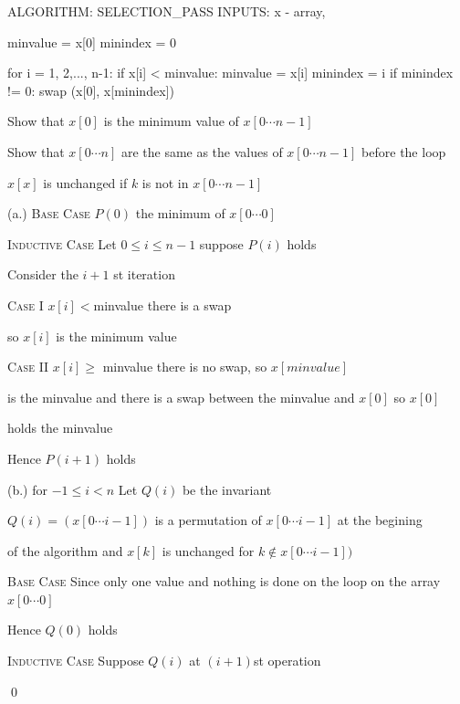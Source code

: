 
\begin{console}
ALGORITHM: SELECTION_PASS
INPUTS: x - array,

minvalue = x[0]
minindex = 0

for i = 1, 2,..., n-1:
    if x[i] < minvalue:
        minvalue = x[i]
        minindex = i
if minindex != 0:
    swap (x[0], x[minindex])
\end{console}

\begin{tightlist}
\item[a.] Show that $x[0]$ is the minimum value of $x[0 \cdots n-1]$
\item[b.] Show that $x[0 \cdots n]$ are the same as the values of $x[0 \cdots n-1]$ before the loop
\item[c.] $x[x]$ is unchanged if $k$ is not in $x[0 \cdots n-1]$
\end{tightlist}

(a.)
\textsc{Base Case} $P(0)$ the minimum of $x[0 \cdots 0]$

\textsc{Inductive Case} Let $0 \leq i \leq n-1$ suppose $P(i)$ holds

Consider the $i+1$ st iteration

\textsc{Case I} $x[i] < $minvalue there is a swap

so $x[i]$ is the minimum value

\textsc{Case II} $x[i] \geq$ minvalue there is no swap, so $x[minvalue]$

is the minvalue and there is a swap between the minvalue and $x[0]$ so $x[0]$

holds the minvalue

Hence $P(i+1)$ holds

(b.) for $-1 \leq i < n$ Let $Q(i)$  be the invariant

$Q(i) = (x[0 \cdots i-1])$ is a permutation of $x[0 \cdots i-1]$ at the begining

of the algorithm and $x[k]$ is unchanged for $k \notin x[0 \cdots i-1])$

\textsc{Base Case}
Since only one value and nothing is done on the loop on the array $x[0 \cdots 0]$

Hence $Q(0)$ holds

\textsc{Inductive Case} Suppose $Q(i)$ at $(i+1)$st operation 

\qed
